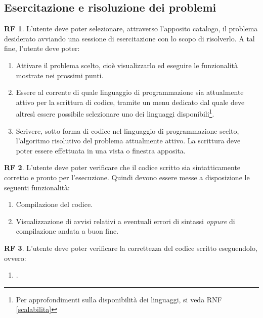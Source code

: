 \documentclass[11pt, a4paper]{article}
\theoremstyle{definition}
\newtheorem{funcreq}{RF} %
\begin{document}
\subsection*{Esercitazione e risoluzione dei problemi}
\begin{funcreq}
L'utente deve poter selezionare, attraverso l'apposito catalogo, il
problema desiderato avviando una sessione di esercitazione con lo scopo
di risolverlo. A tal fine, l'utente deve poter:
\begin{enumerate}
    \item Attivare il problema scelto, cioè visualizzarlo ed eseguire le
    funzionalità mostrate nei prossimi punti.
    
    \item Essere al corrente di quale linguaggio di programmazione sia
    attualmente attivo per la scrittura di codice, tramite un menu dedicato
    dal quale deve altresì essere possibile selezionare uno dei linguaggi
    disponibili\footnote{Per approfondimenti sulla disponibilità dei linguaggi, si veda RNF \ref{scalabilita}}.
    
    \item Scrivere, sotto forma di codice nel linguaggio di programmazione
    scelto, l'algoritmo risolutivo del problema attualmente attivo. La
    scrittura deve poter essere effettuata in una vista o finestra apposita.
\end{enumerate}
\end{funcreq}

\begin{funcreq}
L'utente deve poter verificare che il codice scritto sia sintatticamente
corretto e pronto per l'esecuzione. Quindi devono essere messe a disposizione
le seguenti funzionalità:
\begin{enumerate}
    \item Compilazione del codice.
    \item Visualizzazione di avvisi relativi a eventuali errori di sintassi
    \textit{oppure} di compilazione andata a buon fine.
\end{enumerate}
\end{funcreq}

\begin{funcreq}
L'utente deve poter verificare la correttezza del codice scritto eseguendolo,
ovvero:
\begin{enumerate}
    \item .
\end{enumerate}
\end{funcreq}
\end{document}
